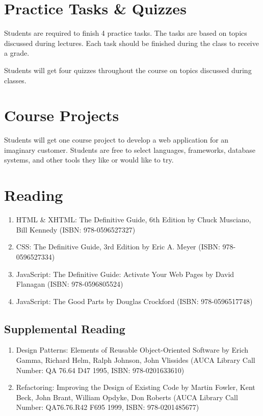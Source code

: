 \documentclass[12pt,a4paper,oneside]{article}
\begin{document}
    \section{Practice Tasks \& Quizzes}

        Students are required to finish 4 practice tasks. The tasks are based on
        topics discussed during lectures. Each task should be finished during
        the class to receive a grade.

        Students will get four quizzes throughout the course on topics discussed
        during classes.

    \section{Course Projects}

        Students will get one course project to develop a web application for an
        imaginary customer. Students are free to select languages, frameworks,
        database systems, and other tools they like or would like
        to try.

    \section{Reading}

        \begin{enumerate}
            \item HTML \& XHTML: The Definitive Guide, 6th Edition by Chuck
            Musciano, Bill Kennedy (ISBN: 978-0596527327)
            \item CSS: The Definitive Guide, 3rd Edition by Eric A. Meyer (ISBN:
            978-0596527334)
            \item JavaScript: The Definitive Guide: Activate Your Web Pages by
            David Flanagan (ISBN: 978-0596805524)
            \item JavaScript: The Good Parts by Douglas Crockford (ISBN:
            978-0596517748)
        \end{enumerate}

            \subsection{Supplemental Reading}

                \begin{enumerate}
                    \item Design Patterns: Elements of Reusable Object-Oriented
                    Software by Erich Gamma, Richard Helm, Ralph Johnson, John
                    Vlissides (AUCA Library Call Number: QA 76.64 D47 1995,
                    ISBN: 978-0201633610)
                    \item Refactoring: Improving the Design of Existing Code by
                    Martin Fowler, Kent Beck, John Brant, William Opdyke, Don
                    Roberts (AUCA Library Call Number: QA76.76.R42 F695 1999,
                    ISBN: 978-0201485677)
                \end{enumerate}
\end{document}
